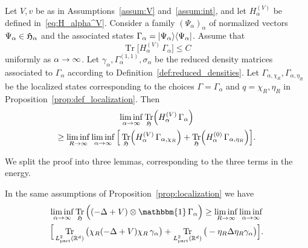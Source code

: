 \documentclass[AHL,Unicode,longabstracts,published]{cedram}
\newcommand{\bra}[1]{\left\langle #1\right|}
\newcommand{\ket}[1]{\left|#1\right\rangle}
\DeclareMathOperator{\Tr}{Tr}
\DeclareMathOperator{\partt}{part}
\newcommand{\R}{\mathbb{R}}
\newcommand{\gH}{\mathfrak{H}}
\newcommand{\1}{\mathds{1}}
\let\oldin\in
\renewcommand{\in}{\mathchoice{\oldin}{\oldin}{\,\oldin\,}{\,\oldin\,}}
\renewcommand*{\to}{\mathchoice{\longrightarrow}{\rightarrow}{\rightarrow}{\rightarrow}}
\let\originalleft\left
\let\originalright\right
\renewcommand{\left}{\mathopen{}\mathclose\bgroup\originalleft}
\renewcommand{\right}{\aftergroup\egroup\originalright}
\begin{document}
\begin{prop}\label{prop:localization}
Let $V,v$ be as in Assumptions~\ref{assum:V} and~\ref{assum:int}, and let $H_\alpha^{(V)}$ be defined in~\eqref{eq:H_alpha^V}. Consider a family $(\Psi_\alpha)_{\alpha}$ of normalized vectors $\Psi_{\alpha}\in  \gH_{\alpha}$ and the associated states $\Gamma_\alpha=\ket{\Psi_\alpha}\bra{\Psi_\alpha}$. Assume that
\begin{equation*}
\Tr\big[H_\alpha^{(V)}\, \Gamma_\alpha\big]\le C
\end{equation*}
uniformly as $\alpha\to\infty$. Let $\gamma_\alpha,\Gamma_\alpha^{(1,1)},\sigma_\alpha$ be the reduced density matrices associated to $\Gamma_\alpha$ according to Definition~\ref{def:reduced_densities}. Let $\Gamma_{\alpha,\chi_R},\Gamma_{\alpha,\eta_R}$ be the localized states corresponding to the choices $\Gamma=\Gamma_\alpha$ and $q=\chi_R,\eta_R$ in Proposition~\ref{prop:def_localization}. Then
\begin{multline}\label{eq:full_energy_localization}
\liminf_{\alpha\to\infty} \Tr_{ \gH}\left(H_\alpha^{(V)}\, \Gamma_\alpha\right) \\
\ge \liminf_{R\to\infty} \liminf_{\alpha\to\infty} \Big[\Tr_{ \gH}\left(H_\alpha^{(V)}\, \Gamma_{\alpha,\chi_R}\right) + \Tr_{ \gH}\left(H_\alpha^{(0)}\, \Gamma_{\alpha,\eta_R}\right)\Big].
\end{multline}
\end{prop}

We split the proof into three lemmas, corresponding to the three terms in the energy.

\begin{lemm}\label{lemma:part_localization}
In the same assumptions of Proposition~\ref{prop:localization} we have
\begin{multline}\label{eq:splitting_particle}
\liminf_{\alpha\to\infty} \Tr_{ \gH}\Big((-\Delta+V)\otimes \mathbbm{1}\,\Gamma_\alpha\Big)
\ge \liminf_{R \to\infty} \liminf_{\alpha\to\infty}\\\Big[\Tr_{L^2_{\partt}(\R^d)}\big(\chi_R (-\Delta+V)\chi_R\,\gamma_\alpha\big)
+ \Tr_{L^2_{\partt}(\R^d)}\big(-\eta_R\Delta\eta_R \gamma_\alpha\big) \Big].
\end{multline}
\end{lemm}
\end{document}
